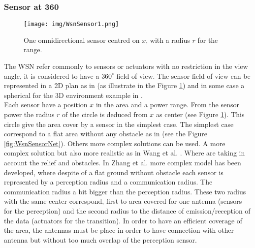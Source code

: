 \subsubsection{Sensor at 360}
%
	\begin{figure}[t!]
	\center
{}
   \texttt{[image: img/WsnSensor1.png]}
  \caption{One omnidirectional sensor centred on $x$, with a radius $r$ for the range.}\label{fig:WsnSensor1}
  \endminipage\hfill
\end{figure}

	

The WSN refer commonly to sensors or actuators  with no restriction in the view angle, it is considered to have a $360^\circ$ field of view. The sensor field of view can be represented in a 2D plan  as in \cite{200*kulkarni2011, 174*zhang2016,150*chakrabarty2002} (as illustrate in the Figure \ref{fig:WsnSensor1}) and in some case a spherical for the 3D environment example in \cite{175*medhi2013,59*wang2008}.  \\
Each sensor have a position $x$ in the area and a power range. From the sensor power  the radius $r$ of the circle is deduced from $x$ as center (see Figure \ref{fig:WsnSensor1}). This circle give the area cover by a sensor in the simplest case. 
The simplest case correspond to a flat area without any obstacle as in \cite{200*kulkarni2011,174*zhang2016} (see the Figure \ref{fig:WsnSensorNet}).  
Others more complex solutions can be used. A more complex solution but also more realistic as in Wang et al. \cite{59*wang2008}. Where are taking in account the relief and obstacles. 
In Zhang et al. \cite{174*zhang2016} more complex model has been developed, where despite of a flat ground without obstacle each sensor is represented by a perception radius and a communication radius. The communication radius a bit bigger than the perception radius. These two radius with the same center correspond, first to area covered for one antenna (sensors for the perception) and the second radius to the distance of emission/reception of the data (actuators for the transition).  In order to have an efficient coverage of the area, the antennas must be place in order to have connection with other antenna but without too much overlap of the perception sensor.\\

